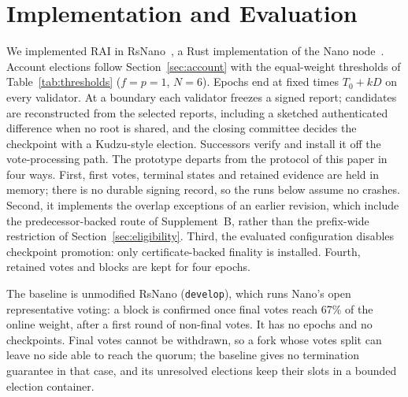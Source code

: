 \section{Implementation and Evaluation}
\label{sec:eval}
We implemented RAI in RsNano~\cite{rsnano}, a Rust implementation of the Nano node~\cite{nano}. Account elections follow Section~\ref{sec:account} with the equal-weight thresholds of Table~\ref{tab:thresholds} ($f=p=1$, $N=6$). Epochs end at fixed times $T_0+kD$ on every validator. At a boundary each validator freezes a signed report; candidates are reconstructed from the selected reports, including a sketched authenticated difference when no root is shared, and the closing committee decides the checkpoint with a Kudzu-style election. Successors verify and install it off the vote-processing path. The prototype departs from the protocol of this paper in four ways. First, first votes, terminal states and retained evidence are held in memory; there is no durable signing record, so the runs below assume no crashes. Second, it implements the overlap exceptions of an earlier revision, which include the predecessor-backed route of Supplement~B, rather than the prefix-wide restriction of Section~\ref{sec:eligibility}. Third, the evaluated configuration disables checkpoint promotion: only certificate-backed finality is installed. Fourth, retained votes and blocks are kept for four epochs.

The baseline is unmodified RsNano (\texttt{develop}), which runs Nano's open representative voting: a block is confirmed once final votes reach 67\% of the online weight, after a first round of non-final votes. It has no epochs and no checkpoints. Final votes cannot be withdrawn, so a fork whose votes split can leave no side able to reach the quorum; the baseline gives no termination guarantee in that case, and its unresolved elections keep their slots in a bounded election container.


